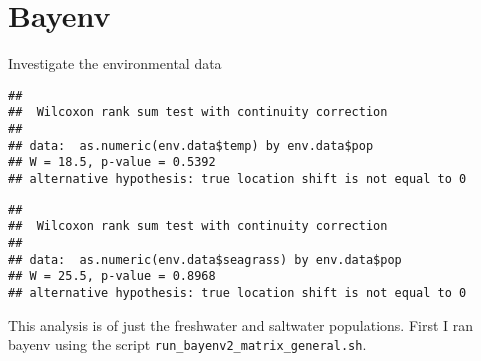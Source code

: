 \documentclass[11pt,]{article}
\newenvironment{Shaded}{\begin{snugshade}}{\end{snugshade}}
\newcommand{\KeywordTok}[1]{\textcolor[rgb]{0.13,0.29,0.53}{\textbf{#1}}}
\newcommand{\DataTypeTok}[1]{\textcolor[rgb]{0.13,0.29,0.53}{#1}}
\newcommand{\DecValTok}[1]{\textcolor[rgb]{0.00,0.00,0.81}{#1}}
\newcommand{\StringTok}[1]{\textcolor[rgb]{0.31,0.60,0.02}{#1}}
\newcommand{\CommentTok}[1]{\textcolor[rgb]{0.56,0.35,0.01}{\textit{#1}}}
\newcommand{\OperatorTok}[1]{\textcolor[rgb]{0.81,0.36,0.00}{\textbf{#1}}}
\newcommand{\NormalTok}[1]{#1}
\begin{document}
\section*{Bayenv}\label{bayenv}

Investigate the environmental data

\begin{Shaded}
\end{Shaded}

\begin{verbatim}
## 
##  Wilcoxon rank sum test with continuity correction
## 
## data:  as.numeric(env.data$temp) by env.data$pop
## W = 18.5, p-value = 0.5392
## alternative hypothesis: true location shift is not equal to 0
\end{verbatim}

\begin{Shaded}
\end{Shaded}

\begin{verbatim}
## 
##  Wilcoxon rank sum test with continuity correction
## 
## data:  as.numeric(env.data$seagrass) by env.data$pop
## W = 25.5, p-value = 0.8968
## alternative hypothesis: true location shift is not equal to 0
\end{verbatim}

This analysis is of just the freshwater and saltwater populations. First
I ran bayenv using the script \texttt{run\_bayenv2\_matrix\_general.sh}.
\end{document}
